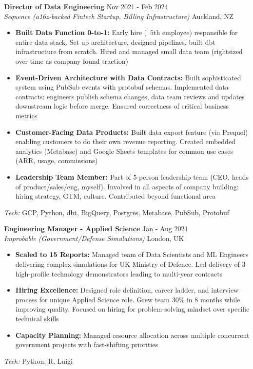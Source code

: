 \documentclass[10pt,a4paper]{article}
\newcommand{\cventry}[5]{
    \textbf{#1} \hfill {\small\color{darkgray} #2} \\
    {\color{accentcolor}\textit{#3}} \hfill {\small\color{darkgray} #4} \\
    #5
    \vspace{6pt}
}
\begin{document}
\cventry
    {Director of Data Engineering}
    {Nov 2021 - Feb 2024}
    {Sequence (a16z-backed Fintech Startup, Billing Infrastructure)}
    {Auckland, NZ}
    {
    \begin{itemize}[leftmargin=*, itemsep=1pt, parsep=0pt, topsep=2pt]
        \item \textbf{Built Data Function 0-to-1:} Early hire (~5th employee) responsible for entire data stack. Set up architecture, designed pipelines, built dbt infrastructure from scratch. Hired and managed small data team (rightsized over time as company found traction)
        \item \textbf{Event-Driven Architecture with Data Contracts:} Built sophisticated system using PubSub events with protobuf schemas. Implemented data contracts: engineers publish schema changes, data team reviews and updates downstream logic before merge. Ensured correctness of critical business metrics
        \item \textbf{Customer-Facing Data Products:} Built data export feature (via Prequel) enabling customers to do their own revenue reporting. Created embedded analytics (Metabase) and Google Sheets templates for common use cases (ARR, usage, commissions)
        \item \textbf{Leadership Team Member:} Part of 5-person leadership team (CEO, heads of product/sales/eng, myself). Involved in all aspects of company building: hiring strategy, GTM, culture. Contributed beyond functional area
    \end{itemize}
    \textit{Tech:} GCP, Python, dbt, BigQuery, Postgres, Metabase, PubSub, Protobuf
    }

\cventry
    {Engineering Manager - Applied Science}
    {Jan - Aug 2021}
    {Improbable (Government/Defense Simulations)}
    {London, UK}
    {
    \begin{itemize}[leftmargin=*, itemsep=1pt, parsep=0pt, topsep=2pt]
        \item \textbf{Scaled to 15 Reports:} Managed team of Data Scientists and ML Engineers delivering complex simulations for UK Ministry of Defence. Led delivery of 3 high-profile technology demonstrators leading to multi-year contracts
        \item \textbf{Hiring Excellence:} Designed role definition, career ladder, and interview process for unique Applied Science role. Grew team 30\% in 8 months while improving quality. Focused on hiring for problem-solving mindset over specific technical skills
        \item \textbf{Capacity Planning:} Managed resource allocation across multiple concurrent government projects with fast-shifting priorities
    \end{itemize}
    \textit{Tech:} Python, R, Luigi
    }
\end{document}
